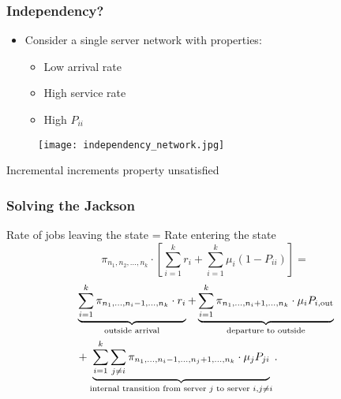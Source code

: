 \documentclass[10pt,notes]{beamer}
\begin{document}
\begin{frame}
    \frametitle{Independency?}
        \begin{itemize}
            \item Consider a single server network with properties:
            \begin{itemize}
                \item Low arrival rate
                \item High service rate
                \item High \(P_{ii}\)
            \end{itemize}
        \end{itemize}
        \begin{figure}
            \texttt{[image: independency\_network.jpg]}
        \end{figure}
        \begin{center} 
            Incremental increments property unsatisfied
        \end{center}

\end{frame}

\begin{frame}
    \frametitle{Solving the Jackson}
    \begin{center} 
    \linespread{1.6}
        Rate of jobs leaving the state = Rate entering the state
   \[
\pi_{n_1,n_2,\ldots,n_k} \cdot \left[ \sum_{i=1}^{k} r_i + \sum_{i=1}^{k} \mu_i (1 - P_{ii})  \right] = 
\]
        \begin{equation}
\begin{aligned}
    \notag
    &\underbrace{\sum_{i=1}^{k} \pi_{n_1,\ldots,n_i - 1,\ldots,n_k} \cdot r_i}_{\text{outside arrival}}
    + \underbrace{\sum_{i=1}^{k} \pi_{n_1,\ldots,n_i + 1,\ldots,n_k} \cdot \mu_i P_{i,\text{out}}}_{\text{departure to outside}} \\
    &+ \underbrace{\sum_{i=1}^{k} \sum_{j \neq i} \pi_{n_1,\ldots,n_i - 1,\ldots,n_j + 1,\ldots,n_k} \cdot \mu_j P_{ji}}_{\text{internal transition from server } j \text{ to server } i, j \neq i}.
\end{aligned}
\end{equation}

        
    \end{center}
    

\end{frame}
\end{document}
